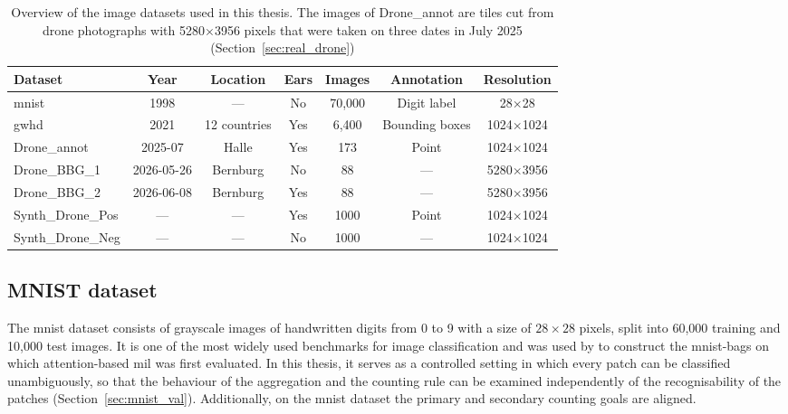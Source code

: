 \documentclass[12pt,parskip = half, DIV=classic,listof=totoc]{scrartcl}
\begin{document}
			\begin{table}[t]
				\centering
				\footnotesize
				\begin{tabular}{@{}lcccccc@{}}
					\toprule
					Dataset & Year & Location & Ears & Images & Annotation & Resolution \\
					\midrule
					\acs*{mnist} & 1998 & --- & No & 70,000 & Digit label & 28$\times$28\\
					\acs*{gwhd} & 2021 & 12 countries & Yes & 6,400 & Bounding boxes & 1024$\times$1024\\
					Drone\_annot & 2025-07 & Halle & Yes & 173 & Point & 1024$\times$1024\\
					Drone\_BBG\_1 & 2026-05-26 & Bernburg & No &  88 & --- & 5280$\times$3956\\
					Drone\_BBG\_2 & 2026-06-08 & Bernburg & Yes &  88 & --- & 5280$\times$3956\\
					Synth\_Drone\_Pos & --- & --- & Yes & 1000 &  Point  & 1024$\times$1024\\
					Synth\_Drone\_Neg & --- & --- & No & 1000 & --- & 1024$\times$1024\\
					\bottomrule
				\end{tabular}
				\caption[Overview of the image datasets used in this thesis]{Overview of the image datasets used in this thesis. 
				The images of Drone\_annot are tiles cut from drone photographs with 5280$\times$3956 pixels that were taken on three dates 
				in July 2025 (Section~\ref{sec:real_drone})}
				\label{tab:datasets}
			\end{table}
		
		\subsection{MNIST dataset}\label{sec:data_mnist}
			The \ac{mnist} dataset \cite{lecunGradientbasedLearningApplied1998} consists of
			grayscale images of handwritten digits from 0 to 9 with a size of $28\times28$
			pixels, split into 60,000 training and 10,000 test images. It is one of the most
			widely used benchmarks for image classification and was used by
			\textcite{ilseAttentionbasedDeepMultiple2018} to construct the \ac{mnist}-bags on
			which attention-based \ac{mil} was first evaluated. In this thesis, it serves as a
			controlled setting in which every patch can be classified unambiguously, so that
			the behaviour of the aggregation and the counting rule can be examined
			independently of the recognisability of the patches (Section~\ref{sec:mnist_val}).
			Additionally, on the \ac{mnist} dataset the primary and secondary counting goals are
			aligned.
\end{document}
